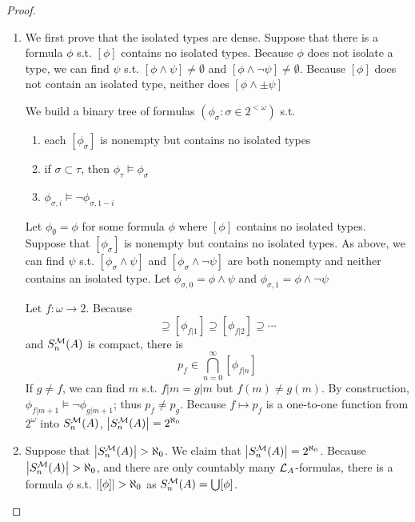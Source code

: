\documentclass[11pt]{article}
\begin{document}
\begin{proof}
\begin{enumerate}
\item We first prove that the isolated types are dense. Suppose that there is a formula \(\phi\)
s.t. \([\phi]\) contains no isolated types. Because \(\phi\) does not isolate a type, we can find \(\psi\)
s.t. \([\phi\wedge\psi]\neq\emptyset\) and \([\phi\wedge\neg\psi]\neq\emptyset\).
 Because \([\phi]\) does not contain an isolated type, neither
does \([\phi\wedge\pm\psi]\)

We build a binary tree of formulas \((\phi_\sigma:\sigma\in 2^{<\omega})\) s.t.
\begin{enumerate}
\item each \([\phi_\sigma]\) is nonempty but contains no isolated types
\item if \(\sigma\subset\tau\), then \(\phi_\tau\vDash\phi_\sigma\)
\item \(\phi_{\sigma,i}\vDash\neg\phi_{\sigma,1-i}\)
\end{enumerate}
Let \(\phi_\emptyset=\phi\) for some formula \(\phi\) where \([\phi]\) contains no isolated types. Suppose
that \([\phi_\sigma]\) is nonempty but contains no isolated types. As above, we can find \(\psi\)
s.t. \([\phi_\sigma\wedge\psi]\) and \([\phi_\sigma\wedge\neg\psi]\) are both nonempty and neither contains an isolated type.
Let \(\phi_{\sigma,0}=\phi\wedge\psi\) and \(\phi_{\sigma,1}=\phi\wedge\neg\psi\)

Let \(f:\omega\to 2\). Because
\begin{equation*}
 [\phi_{f|0}]\supseteq[\phi_{f|1}]\supseteq[\phi_{f|2}]\supseteq\cdots
 \end{equation*}
and \(S_n^{\mathcal{M}}(A)\) is compact, there is
\begin{equation*}
 p_f\in\bigcap_{n=0}^\infty[\phi_{f|n}]
 \end{equation*}
If \(g\neq f\), we can find \(m\) s.t. \(f|m=g|m\) but \(f(m)\neq g(m)\). By
construction, \(\phi_{f|m+1}\vDash\neg\phi_{g|m+1}\); thus \(p_f\neq p_g\). Because \(f\mapsto p_f\) is a one-to-one
function from \(2^\omega\) into \(S_n^{\mathcal{M}}(A)\), \(\abs{S_n^{\calm}(A)}=2^{\aleph_0}\)
\item Suppose that \(\abs{S_n^{\calm}(A)}>\aleph_0\). We claim that \(\abs{S_n^{\calm}(A)}=2^{\aleph_0}\).
Because \(\abs{S_n^{\calm}(A)}>\aleph_0\), and there are only countably many \(\mathcal{L}_A\)-formulas, there
is a formula \(\phi\) s.t. \(\abs{[\phi]}>\aleph_0\) as \(S_n^{\mathcal{M}}(A)=\bigcup[\phi]\).


\end{enumerate}
\end{proof}
\end{document}
